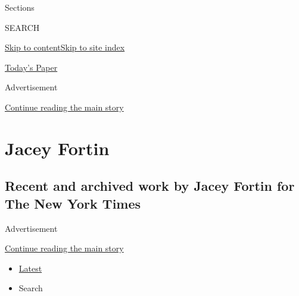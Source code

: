 Sections

SEARCH

\protect\hyperlink{site-content}{Skip to
content}\protect\hyperlink{site-index}{Skip to site index}

\href{https://myaccount.nytimes3xbfgragh.onion/auth/login?response_type=cookie\&client_id=vi}{}

\href{https://www.nytimes3xbfgragh.onion/section/todayspaper}{Today's
Paper}

Advertisement

\protect\hyperlink{after-top}{Continue reading the main story}

\hypertarget{jacey-fortin}{%
\section{Jacey Fortin}\label{jacey-fortin}}

\hypertarget{recent-and-archived-work-by-jacey-fortin-for-the-new-york-times}{%
\subsection{Recent and archived work by Jacey Fortin for The New York
Times}\label{recent-and-archived-work-by-jacey-fortin-for-the-new-york-times}}

Advertisement

\protect\hyperlink{after-mid1}{Continue reading the main story}

\begin{itemize}
\tightlist
\item
  \protect\hyperlink{stream-panel}{Latest}
\item
  Search
\end{itemize}

